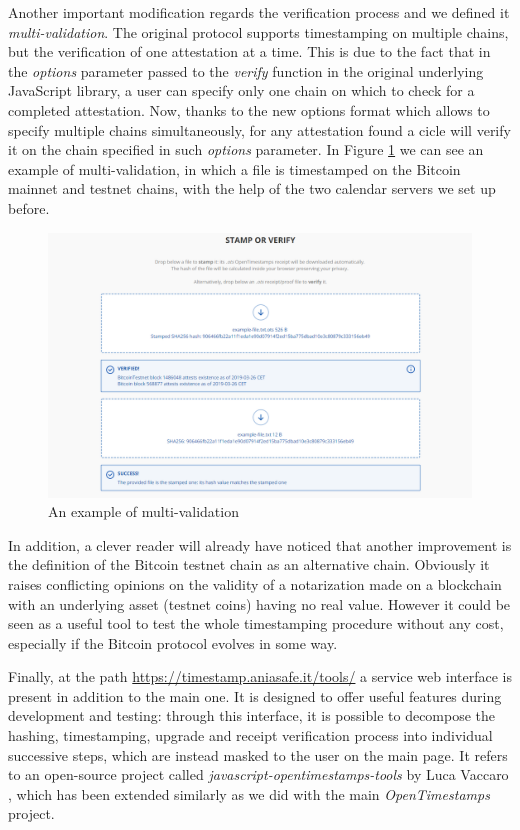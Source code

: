 \bigskip
\noindent
Another important modification regards the verification process and we defined it \textit{multi-validation}. The original protocol supports timestamping on multiple chains, but the verification of one attestation at a time. This is due to the fact that in the \textit{options} parameter passed to the \textit{verify} function in the original underlying JavaScript library, a user can specify only one chain on which to check for a completed attestation. Now, thanks to the new options format which allows to specify multiple chains simultaneously, for any attestation found a cicle will verify it on the chain specified in such \textit{options} parameter. In Figure \ref{fig:multivalidation} we can see an example of multi-validation, in which a file is timestamped on the Bitcoin mainnet and testnet chains, with the help of the two calendar servers we set up before.

\begin{figure}[ht]
    \centering
	\includegraphics[width=1\linewidth]{Images/multivalidation.png}
	\caption{An example of multi-validation}
	\label{fig:multivalidation}
\end{figure}

\bigskip
\noindent
In addition, a clever reader will already have noticed that another improvement is the definition of the Bitcoin testnet chain as an alternative chain. Obviously it raises conflicting opinions on the validity of a notarization made on a blockchain with an underlying asset (testnet coins) having no real value. However it could be seen as a useful tool to test the whole timestamping procedure without any cost, especially if the Bitcoin protocol evolves in some way.

\bigskip
\noindent
Finally, at the path \url{https://timestamp.aniasafe.it/tools/} a service web interface is present in addition to the main one. It is designed to offer useful features during development and testing: through this interface, it is possible to decompose the hashing, timestamping, upgrade and receipt verification process into individual successive steps, which are instead masked to the user on the main page. It refers to an open-source project called \textit{javascript-opentimestamps-tools} by Luca Vaccaro \cite{OTStools}, which has been extended similarly as we did with the main \textit{OpenTimestamps} project.